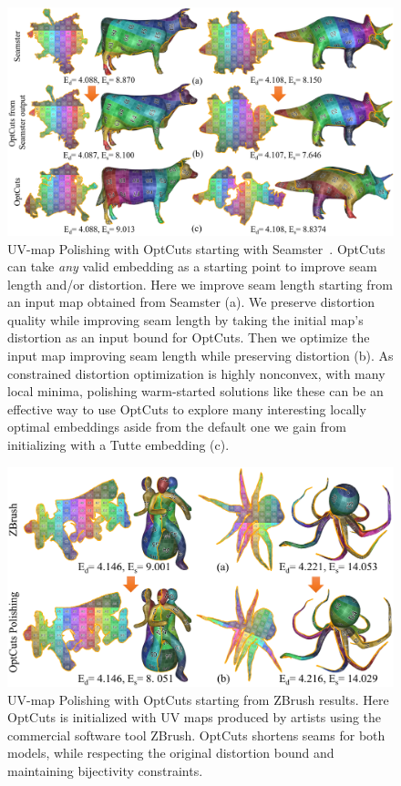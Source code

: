 \begin{figure}[t]
\centering
\includegraphics[width=\linewidth]{fig/comp_Seamster.png}
\caption{UV-map Polishing with OptCuts starting with Seamster~\cite{Sheffer2002Seamster}. OptCuts can take \emph{any} valid embedding as a starting point to improve seam length and/or distortion. Here we improve seam length starting from an input map obtained from Seamster (a). We preserve distortion quality while improving seam length by taking the initial map's distortion as an input bound for OptCuts. Then we optimize the input map improving seam length while preserving distortion (b). As constrained distortion optimization is highly nonconvex, with many local minima, polishing warm-started solutions like these can be an effective way to use OptCuts to explore many interesting locally optimal embeddings aside from the default one we gain from initializing with a Tutte embedding (c).}
\label{fig:comp_Seamster}
\end{figure}

\begin{figure}[t]
\centering
\includegraphics[width=\linewidth]{fig/polish_ZB.png}
\caption{UV-map Polishing with OptCuts starting from ZBrush results. Here OptCuts is initialized with UV maps produced by artists using the commercial software tool ZBrush. OptCuts shortens seams for both models, while respecting the original distortion bound and maintaining bijectivity constraints.}
\label{fig:polish_zbrush}
\end{figure}


